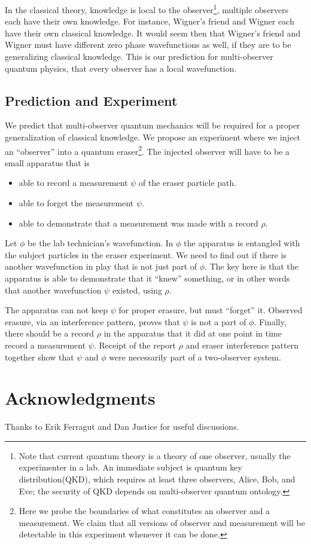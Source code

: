 \documentclass[12pt,a4paper]{article}
\theoremstyle{myrule}
\theoremstyle{postulate}
\theoremstyle{definition}
\begin{document}
In the classical theory, knowledge is local to the observer\footnote{Note that current quantum theory is a theory of one observer, usually the experimenter in a lab.  An immediate subject is quantum key distribution(QKD), which requires at least three observers, Alice, Bob, and Eve; the security of QKD depends on multi-observer quantum ontology.}, multiple observers each have their own knowledge.  For instance, Wigner's friend and Wigner each have their own classical knowledge.  It would seem then that Wigner's friend and Wigner must have different zero phase wavefunctions as well, if they are to be generalizing classical knowledge.  This is our prediction for multi-observer quantum physics, that every observer has a local wavefunction. 

\subsection{Prediction and Experiment}

We predict that multi-observer quantum mechanics will be required for a proper generalization of classical knowledge.  We propose an experiment where we inject an ``observer'' into a quantum eraser\footnote{Here we probe the boundaries of what constitutes an observer and a measurement.  We claim that all versions of observer and measurement will be detectable in this experiment whenever it can be done.}.  The injected observer will have to be a small apparatus that is
\begin{itemize}
   \item able to record a measurement $\psi$ of the eraser particle path.
   \item able to forget the measurement $\psi$.
   \item able to demonstrate that a measurement was made with a record $\rho$.
\end{itemize}
Let $\phi$ be the lab technician's wavefunction.  In $\phi$ the apparatus is entangled with the subject particles in the eraser experiment.  We need to find out if there is another wavefunction in play that is not just part of $\phi$.  The key here is that the apparatus is able to demonstrate that it ``knew'' something, or in other words that another wavefunction $\psi$ existed, using $\rho$.

The apparatus can not keep $\psi$ for proper erasure, but must ``forget'' it.  Observed erasure, via an interference pattern, proves that $\psi$ is not a part of $\phi$.  Finally, there should be a record $\rho$ in the apparatus that it did at one point in time record a measurement $\psi$.  Receipt of the report $\rho$ and eraser interference pattern together show that $\psi$ and $\phi$ were necessarily part of a two-observer system.

\section{Acknowledgments}
Thanks to Erik Ferragut and Dan Justice for useful discussions.



\end{document}
